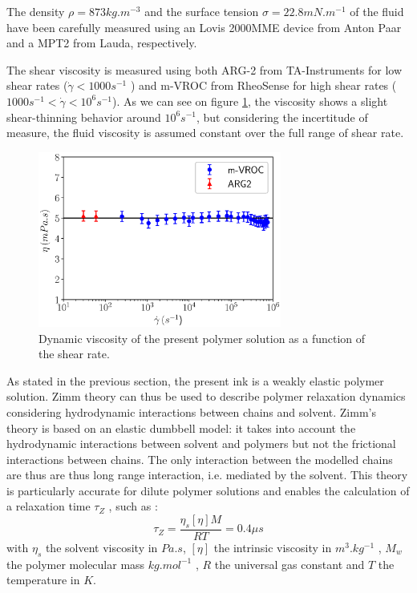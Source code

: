 \documentclass[twocolumn,10pt]{asme2ej}
\begin{document}
The density $\rho = 873 kg.m^{-3}$ and the surface tension $\sigma = 22.8 mN.m^{-1}$ of the fluid have been carefully measured using an Lovis 2000MME device from Anton Paar and a MPT2 from Lauda, respectively. 

The shear viscosity is measured using both ARG-2 from TA-Instruments for low shear rates ($\dot{\gamma} < 1000 s^{-1}$ ) and m-VROC from RheoSense for high shear rates ($1000 s^{-1}<\dot{\gamma} < 10^6 s^{-1}$). As we can see on figure \ref{beahaviorLaw}, the viscosity shows a slight shear-thinning behavior around $10^6s^{-1}$, but considering the incertitude of measure, the fluid viscosity is assumed constant over the full range of shear rate.

\begin{figure}[H]
    \centering
    \includegraphics[width=8cm]{./visco.eps}
    \caption{Dynamic viscosity of the present polymer solution as a function of the shear rate.}
    \label{beahaviorLaw}
\end{figure}

As stated in the previous section, the present ink is a weakly elastic polymer solution. Zimm theory \cite{zimm1956dynamics} can thus be used to describe polymer relaxation dynamics considering hydrodynamic interactions between chains and solvent. Zimm's theory is based on an elastic dumbbell model: it takes into account the hydrodynamic interactions between solvent and polymers but not the frictional interactions between chains. The only interaction between the modelled chains are thus are thus long range interaction, i.e. mediated by the solvent.
This theory is particularly accurate for dilute polymer solutions and enables the calculation of a relaxation time $\tau_Z$ , such as :
\begin{equation}
    \tau_Z = \frac{\eta_s [\eta] M}{RT} = 0.4 \mu s
    \label{zimm} 
\end{equation}
with $\eta_s$ the solvent viscosity in $Pa.s$, $[\eta]$ the intrinsic viscosity in $m^3.kg^{-1}$ , $M_w$ the
polymer molecular mass $kg.mol^{-1}$ , $R$ the universal gas constant and $T$ the temperature in $K$.
\end{document}
